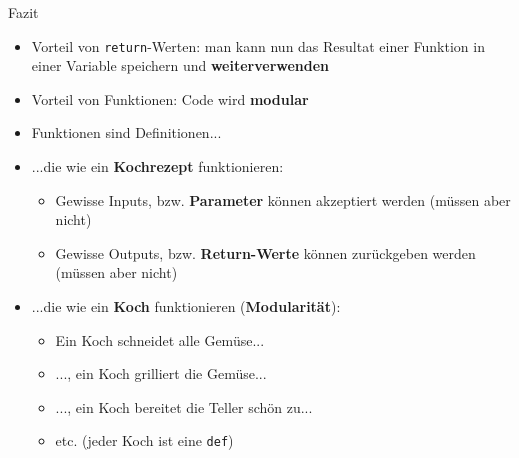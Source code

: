 \begin{frame}{Fazit}
	\begin{itemize}[<+->]
		\item {} Vorteil von \lstinline|return|-Werten: man kann nun das Resultat einer Funktion in einer Variable speichern und \textbf{weiterverwenden}
		\item {} Vorteil von Funktionen: Code wird \textbf{modular}
		\item Funktionen sind Definitionen...
		\item {} ...die wie ein \textbf{Kochrezept} funktionieren:
		      \begin{itemize}
			      \item {}   Gewisse Inputs, bzw. \textbf{Parameter} können akzeptiert werden (müssen aber nicht)
			      \item {} Gewisse Outputs, bzw. \textbf{Return-Werte }können zurückgeben werden (müssen aber nicht)
		      \end{itemize}
		\item {} ...die wie ein \textbf{Koch} funktionieren (\textbf{Modularität}):
		      \begin{itemize}
			      \item Ein Koch schneidet alle Gemüse...
			      \item ..., ein Koch grilliert die Gemüse...
			      \item ..., ein Koch bereitet die Teller schön zu...
			      \item etc. (jeder Koch ist eine \lstinline|def|)
		      \end{itemize}
	\end{itemize}
\end{frame}